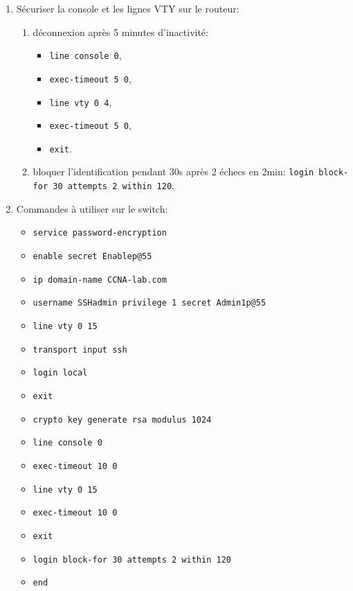 \documentclass[a4paper]{article}
\begin{document}
\begin{enumerate}
    \item Sécuriser la console et les lignes VTY sur le routeur:
    \begin{enumerate}
        \item déconnexion après 5 minutes d'inactivité:
        \begin{itemize}
            \item \texttt{line console 0},
            \item \texttt{exec-timeout 5 0},
            \item \texttt{line vty 0 4},
            \item \texttt{exec-timeout 5 0},
            \item \texttt{exit}.
        \end{itemize}
        \item bloquer l'identification pendant 30s après 2 échecs en 2min: \texttt{login block-for 30 attempts 2 within 120}.
    \end{enumerate}

    \item Commandes à utiliser sur le switch:
    \begin{itemize}
        \item \texttt{service password-encryption}
        \item \texttt{enable secret Enablep@55}
        \item \texttt{ip domain-name CCNA-lab.com}
        \item \texttt{username SSHadmin privilege 1 secret Admin1p@55}
        \item \texttt{line vty 0 15}
        \item \texttt{transport input ssh}
        \item \texttt{login local}
        \item \texttt{exit}
        \item \texttt{crypto key generate rsa modulus 1024}
        \item \texttt{line console 0}
        \item \texttt{exec-timeout 10 0}
        \item \texttt{line vty 0 15}
        \item \texttt{exec-timeout 10 0}
        \item \texttt{exit}
        \item \texttt{login block-for 30 attempts 2 within 120}
        \item \texttt{end}
    \end{itemize}

\end{enumerate}
\end{document}
